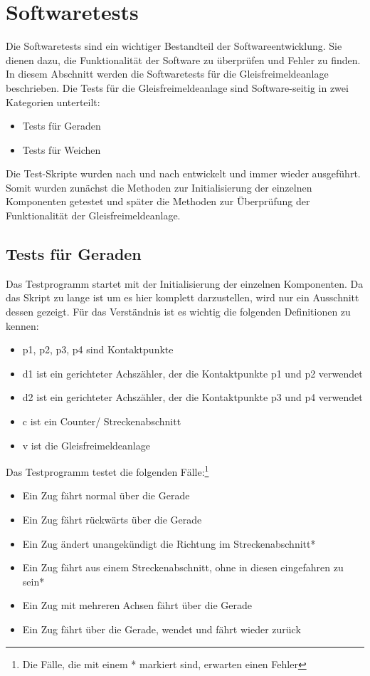 \section{Softwaretests}\label{text:Entwicklung-der-GFA:Softwaretests}

Die Softwaretests sind ein wichtiger Bestandteil der Softwareentwicklung. Sie dienen dazu, die Funktionalität der Software zu überprüfen und Fehler zu finden. In diesem Abschnitt werden die Softwaretests für die Gleisfreimeldeanlage beschrieben.\newline
Die Tests für die Gleisfreimeldeanlage sind Software-seitig in zwei Kategorien unterteilt:
\begin{itemize}
    \item Tests für Geraden
    \item Tests für Weichen
\end{itemize}
Die Test-Skripte wurden nach und nach entwickelt und immer wieder ausgeführt. Somit wurden zunächst die Methoden zur Initialisierung der einzelnen Komponenten getestet und später die Methoden zur Überprüfung der Funktionalität der Gleisfreimeldeanlage.

\subsection{Tests für Geraden}\label{text:Entwicklung-der-GFA:Softwaretests:Tests-für-Geraden}

Das Testprogramm startet mit der Initialisierung der einzelnen Komponenten. Da das Skript zu lange ist um es hier komplett darzustellen, wird nur ein Ausschnitt dessen gezeigt. Für das Verständnis ist es wichtig die folgenden Definitionen zu kennen:
\begin{itemize}
    \item p1, p2, p3, p4 sind Kontaktpunkte
    \item d1 ist ein gerichteter Achszähler, der die Kontaktpunkte p1 und p2 verwendet
    \item d2 ist ein gerichteter Achszähler, der die Kontaktpunkte p3 und p4 verwendet
    \item c ist ein Counter/ Streckenabschnitt
    \item v ist die Gleisfreimeldeanlage
\end{itemize}

Das Testprogramm testet die folgenden Fälle:\footnote{Die Fälle, die mit einem * markiert sind, erwarten einen Fehler}
\begin{itemize}
    \item Ein Zug fährt normal über die Gerade
    \item Ein Zug fährt rückwärts über die Gerade
    \item Ein Zug ändert unangekündigt die Richtung im Streckenabschnitt*
    \item Ein Zug fährt aus einem Streckenabschnitt, ohne in diesen eingefahren zu sein*
    \item Ein Zug mit mehreren Achsen fährt über die Gerade
    \item Ein Zug fährt über die Gerade, wendet und fährt wieder zurück
\end{itemize}

